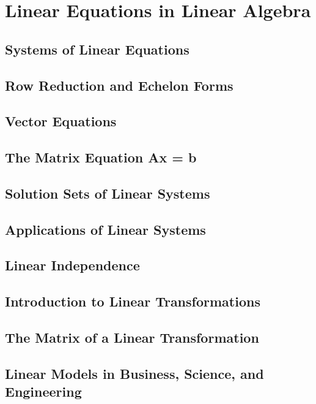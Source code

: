 \documentclass[../linalg.tex]{subfiles}
\begin{document}
\chapter{Linear Equations in Linear Algebra}
\section{Systems of Linear Equations}

\section{Row Reduction and Echelon Forms}
\section{Vector Equations}
\section{The Matrix Equation Ax = b}
\section{Solution Sets of Linear Systems}
\section{Applications of Linear Systems}
\section{Linear Independence}
\section{Introduction to Linear Transformations}
\section{The Matrix of a Linear Transformation}
\section{Linear Models in Business, Science, and Engineering}
\end{document}
